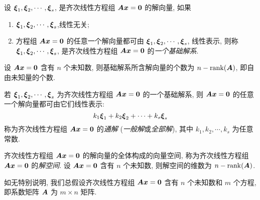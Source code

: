 \begin{definition}[齐次线性方程组的基础解系]
    设 $ \vb*{\xi}_1, \vb*{\xi}_2, \cdots ,\vb*{\xi}_s$, 是齐次线性方程组 $ \vb*{A x}=\vb*{0} $ 的解向量, 如果
    \begin{enumerate}[label=(\arabic{*})]
        \item $\vb*{\xi}_{1}, \vb*{\xi}_{2}, \cdots, \vb*{\xi}_s $,线性无关;
        \item 方程组 $ \vb*{A x}=\vb*{0} $ 的任意一个解向量都可由 $ \vb*{\xi}_{1}, \vb*{\xi}_{2}, \cdots, \vb*{\xi}_s $, 线性表示, 则称 $ \vb*{\xi}_{1}, \vb*{\xi}_{2}, \cdots, \vb*{\xi}_{s}$, 是齐次线性方程组 $\vb*{ A }\vb*{x}=\vb*{0} $ 的\textit{一个基础解系}.
    \end{enumerate}
\end{definition}

\begin{theorem}[基础解系的个数]
    设 $ \vb*{A x}=\vb*{0} $ 含有 $ n $ 个未知数, 则基础解系所含解向量的个数为 $ n-\rank(\vb*{A}) $, 即自由未知量的个数.
\end{theorem}

\begin{definition}[齐次方程组的通解]
    若 $ \vb*{\xi}_{1}, \vb*{\xi}_{2}, \cdots, \vb*{\xi}_{s} $ 为齐次线性方程组 $ \vb*{A x}=\vb*{0} $ 的一个基础解系, 则 $ \vb*{A x}=\vb*{0} $ 的任意一个解向量都可由它们线性表示:
    $$k_{1} \vb*{\xi}_{1}+k_{2} \vb*{\xi}_{2}+\cdots+k_{s} \vb*{\xi}_s$$
    称为齐次线性方程组 $ \vb*{A x}=\vb*{0} $ 的\textit{通解} (\textit{一般解}或\textit{全部解}), 其中 $ k_{1}, k_{2}, \cdots, k_s $ 为任意常数.
\end{definition}

\begin{definition}[齐次线性方程组的解空间]
    齐次线性方程组 $ \vb*{A x}=\vb*{0} $ 的解向量的全体构成的向量空间, 称为齐次线性方程组 $ \vb*{A x}=\vb*{0} $ 的\textit{解空间}. 设 $ \vb*{A} \vb*{x}=\vb*{0} $ 含有 $ n $ 个未知数, 则解空间的维数为 $ n-\rank(\vb*{A}) $.
\end{definition}

如无特别说明, 我们总假设齐次线性方程组 $ \vb*{A x}=\vb*{0} $ 含有 $ n $ 个未知数和 $ m $ 个方程, 即系数矩阵 $ \vb*{A }$ 为 $ m \times n $ 矩阵.

